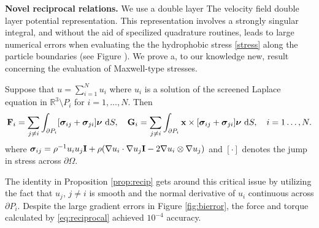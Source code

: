 \textbf{Novel reciprocal relations.}
We use a double layer The velocity field  double layer potential representation.
This representation involves a strongly singular integral, and without the aid of specilized
quadrature routines, leads to large numerical errors when evaluating the the hydrophobic stress \eqref{stress} along the particle boundaries (see Figure \cite{fig:bierror}).
We prove a, to our knowledge new, result concerning the evaluation of Maxwell-type stresses. 
\begin{proposition}
  \label{prop:recip}
  Suppose that $u = \sum_{i=1}^N u_i$ where $u_i$ is a solution of the screened Laplace equation
  in $\mathbb{R}^3 \setminus P_i$ for $i=1,\dots, N.$ Then 
  \begin{equation}
    \label{eq:reciprocal}
{\bf F}_i = \sum_{j \neq i} \int_{\partial P_i}[\boldsymbol{\sigma}_{ij} + \boldsymbol{\sigma}_{ji}]\boldsymbol{\nu}\,\dif S,\quad
{\bf G}_i = \sum_{j \neq i} \int_{\partial P_i} {\bf x} \times [\boldsymbol{\sigma}_{ij} + \boldsymbol{\sigma}_{ji}]\boldsymbol{\nu}\,\dif S, \quad i = 1\dots, N.
\end{equation}
where $\boldsymbol{\sigma}_{ij} = \rho^{-1} u_iu_j {\bf I} + \rho(\nabla u_i \cdot \nabla u_j {\bf I} - 2 \nabla u_i \otimes \nabla u_j)$ and
$[\cdot]$ denotes the jump in stress across $\partial \Omega.$ 
\end{proposition}


The identity in Proposition \ref{prop:recip} gets around this critical issue by utilizing the fact that $u_j$, $j\neq i$ is smooth and the normal derivative
of  $u_i$ continuous across $\partial P_i$. Despite the large gradient errors in Figure \ref{fig:bierror}, the force and torque
calculated by \eqref{eq:reciprocal} achieved $10^{-4}$ accuracy.




